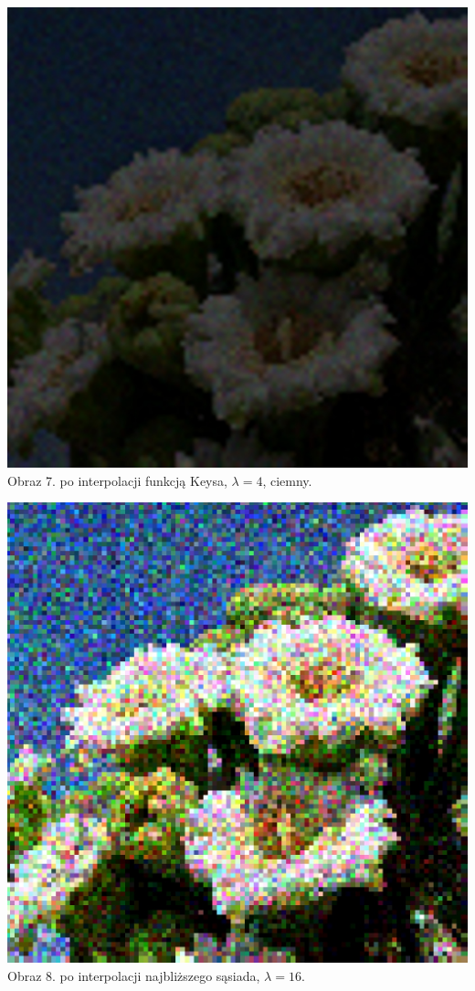\documentclass[14pt]{article}
\begin{document}
\begin{center}
    \vspace{0.5cm}
    \includegraphics[scale=0.15]{images/Poisson_keys_dark_4x.jpg}
    \\ \small Obraz 7. po interpolacji funkcją Keysa, 
    $\lambda = 4$, ciemny.

    \vspace{0.5cm}
    \includegraphics[scale=0.15]{images/Poisson_nearest_16x.jpg}
    \\ \small Obraz 8. po interpolacji najbliższego sąsiada, 
    $\lambda = 16$.


\end{center}
\end{document}

